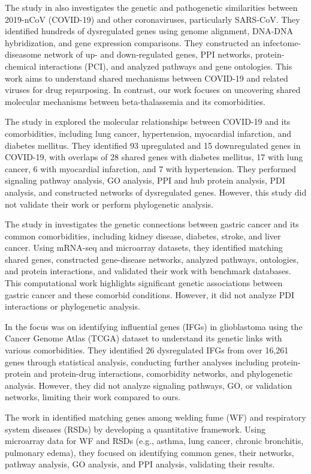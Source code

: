 The study in \cite{b4} also investigates the genetic and pathogenetic similarities between 2019-nCoV (COVID-19) and other coronaviruses, particularly SARS-CoV. They identified hundreds of dysregulated genes using genome alignment, DNA-DNA hybridization, and gene expression comparisons. They constructed an infectome-diseasome network of up- and down-regulated genes, PPI networks, protein-chemical interactions (PCI), and analyzed pathways and gene ontologies. This work aims to understand shared mechanisms between COVID-19 and related viruses for drug repurposing. In contrast, our work focuses on uncovering shared molecular mechanisms between beta-thalassemia and its comorbidities.

The study in \cite{b6} explored the molecular relationships between COVID-19 and its comorbidities, including lung cancer, hypertension, myocardial infarction, and diabetes mellitus. They identified 93 upregulated and 15 downregulated genes in COVID-19, with overlaps of 28 shared genes with diabetes mellitus, 17 with lung cancer, 6 with myocardial infarction, and 7 with hypertension. They performed signaling pathway analysis, GO analysis, PPI and hub protein analysis, PDI analysis, and constructed networks of dysregulated genes. However, this study did not validate their work or perform phylogenetic analysis.

The study in \cite{b7} investigates the genetic connections between gastric cancer and its common comorbidities, including kidney disease, diabetes, stroke, and liver cancer. Using mRNA-seq and microarray datasets, they identified matching shared genes, constructed gene-disease networks, analyzed pathways, ontologies, and protein interactions, and validated their work with benchmark databases. This computational work highlights significant genetic associations between gastric cancer and these comorbid conditions. However, it did not analyze PDI interactions or phylogenetic analysis.

In \cite{b8} the focus was on identifying influential genes (IFGs) in glioblastoma using the Cancer Genome Atlas (TCGA) dataset to understand its genetic links with various comorbidities. They identified 26 dysregulated IFGs from over 16,261 genes through statistical analysis, conducting further analyses including protein-protein and protein-drug interactions, comorbidity networks, and phylogenetic analysis. However, they did not analyze signaling pathways, GO, or validation networks, limiting their work compared to ours.

The work in \cite{b9} identified matching genes among welding fume (WF) and respiratory system diseases (RSDs) by developing a quantitative framework. Using microarray data for WF and RSDs (e.g., asthma, lung cancer, chronic bronchitis, pulmonary edema), they focused on identifying common genes, their networks, pathway analysis, GO analysis, and PPI analysis, validating their results.

